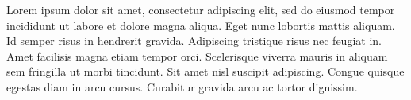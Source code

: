 {
\setlength{\columnsep}{30pt}
\begin{multicols*}{2}
{
    Lorem ipsum dolor sit amet, consectetur adipiscing elit, sed do eiusmod tempor incididunt ut labore et dolore magna aliqua. Eget nunc lobortis mattis aliquam. Id semper risus in hendrerit gravida. Adipiscing tristique risus nec feugiat in. Amet facilisis magna etiam tempor orci. Scelerisque viverra mauris in aliquam sem fringilla ut morbi tincidunt. Sit amet nisl suscipit adipiscing.
}
\pagebreak
{
    Congue quisque egestas diam in arcu cursus. Curabitur gravida arcu ac tortor dignissim.
}
\end{multicols*}
}

